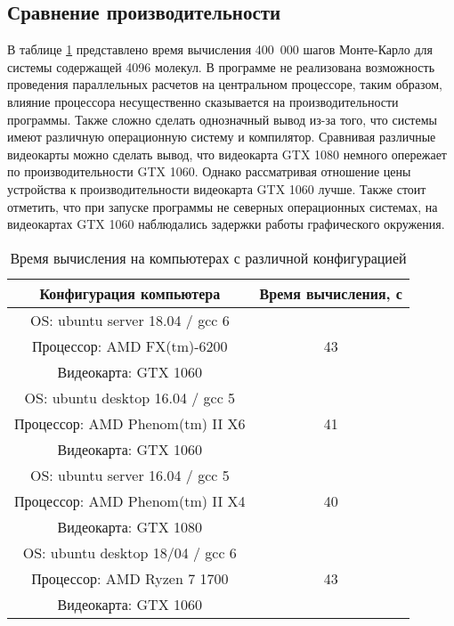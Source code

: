 \subsection{Сравнение производительности}

В таблице \ref{tab.time} представлено время вычисления 400~000 шагов Монте-Карло для системы содержащей 4096 молекул. В программе не реализована возможность проведения параллельных расчетов на центральном процессоре, таким образом, влияние процессора несущественно сказывается на производительности программы. Также сложно сделать однозначный вывод из-за того, что системы имеют различную операционную систему и компилятор. Сравнивая различные видеокарты можно сделать вывод, что видеокарта GTX 1080 немного опережает по производительности GTX 1060. Однако рассматривая отношение цены устройства к производительности видеокарта GTX 1060 лучше. Также стоит отметить, что при запуске программы не северных операционных системах, на видеокартах GTX 1060 наблюдались задержки работы графического окружения.

\begin{table}[]
	\caption{Время вычисления на компьютерах с различной конфигурацией} \label{tab.time}
	\begin{tabular}{|c|c|}
		\hline
		Конфигурация компьютера & Время вычисления, с \\ \hline
		OS: ubuntu server 18.04 / gcc 6 &\\		
		Процессор: AMD FX(tm)-6200& 43\\
		Видеокарта: GTX 1060 & \\ \hline
		
		OS: ubuntu desktop 16.04 / gcc 5 &\\
		Процессор: AMD Phenom(tm) II X6& 41\\
		Видеокарта: GTX 1060 & \\ \hline
		
		OS: ubuntu server 16.04 / gcc 5 &\\
		Процессор: AMD Phenom(tm) II X4&		40\\
		Видеокарта: GTX 1080 & \\ \hline
		
		OS: ubuntu desktop 18/04 / gcc 6 &\\
		Процессор: AMD Ryzen 7 1700 & 	43\\
		Видеокарта: GTX 1060 & \\ \hline
		
	\end{tabular}
\end{table}





